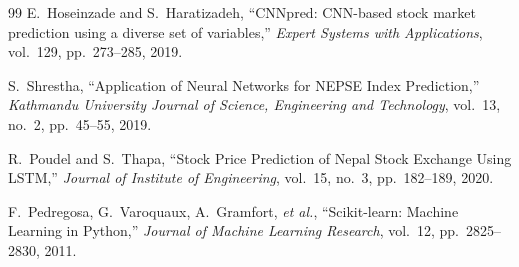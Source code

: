 \documentclass[12pt, a4paper]{report}
\begin{document}
\begin{thebibliography}{99}
		E.~Hoseinzade and S.~Haratizadeh,
		``CNNpred: CNN-based stock market prediction using a diverse set of variables,''
		\textit{Expert Systems with Applications},
		vol.~129, pp.~273--285, 2019.
		
		S.~Shrestha,
		``Application of Neural Networks for NEPSE Index Prediction,''
		\textit{Kathmandu University Journal of Science, Engineering and Technology},
		vol.~13, no.~2, pp.~45--55, 2019.
		
		R.~Poudel and S.~Thapa,
		``Stock Price Prediction of Nepal Stock Exchange Using LSTM,''
		\textit{Journal of Institute of Engineering},
		vol.~15, no.~3, pp.~182--189, 2020.
		
		F.~Pedregosa, G.~Varoquaux, A.~Gramfort, \textit{et al.},
		``Scikit-learn: Machine Learning in Python,''
		\textit{Journal of Machine Learning Research},
		vol.~12, pp.~2825--2830, 2011.
		
	\end{thebibliography}
	
\end{document}
